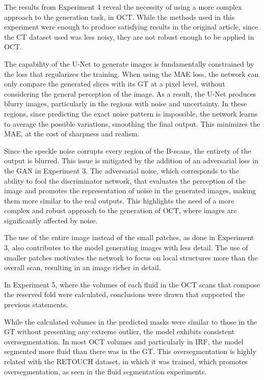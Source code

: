 \par
The results from Experiment 4 reveal the necessity of using a more complex approach to the generation task, in OCT. While the methods used in this experiment were enough to produce satisfying results in the original article, since the CT dataset used was less noisy, they are not robust enough to be applied in OCT.
\par
The capability of the U-Net to generate images is fundamentally constrained by the loss that regularizes the training. When using the MAE loss, the network can only compare the generated slices with its GT at a pixel level, without considering the general perception of the image. As a result, the U-Net produces blurry images, particularly in the regions with noise and uncertainty. In these regions, since predicting the exact noise pattern is impossible, the network learns to average the possible variations, smoothing the final output. This minimizes the MAE, at the cost of sharpness and realism.
\par
Since the speckle noise corrupts every region of the B-scans, the entirety of the output is blurred. This issue is mitigated by the addition of an adversarial loss in the GAN in Experiment 3. The adversarial noise, which corresponds to the ability to fool the discriminator network, that evaluates the perception of the image and promotes the representation of noise in the generated images, making them more similar to the real outputs. This highlights the need of a more complex and robust approach to the generation of OCT, where images are significantly affected by noise.
\par
The use of the entire image instead of the small patches, as done in Experiment 3, also contributes to the model generating images with less detail. The use of smaller patches motivates the network to focus on local structures more than the overall scan, resulting in an image richer in detail.
\par
In Experiment 5, where the volumes of each fluid in the OCT scans that compose the reserved fold were calculated, conclusions were drawn that supported the previous statements. 
\par
While the calculated volumes in the predicted masks were similar to those in the GT without presenting any extreme outlier, the model exhibits consistent oversegmentation. In most OCT volumes and particularly in IRF, the model segmented more fluid than there was in the GT. This oversegmentation is highly related with the RETOUCH dataset, in which it was trained, which promotes oversegmentation, as seen in the fluid segmentation experiments. 
